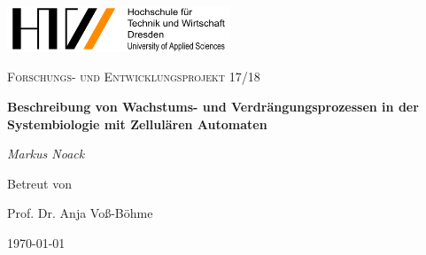 \documentclass[11pt,a4paper,pointlessnumbers]{scrreprt}  %
\begin{document}
	\begin{titlepage}
		\centering
		\includegraphics[width=0.5\textwidth]{Htw-dresden-logo}\par\vspace{1cm}
		{\scshape\Large Forschungs- und Entwicklungsprojekt 17/18\par}
		\vspace{1.5cm}
		{\huge\bfseries Beschreibung von Wachstums- und
			Verdrängungsprozessen in der Systembiologie mit
			Zellulären Automaten\par}
		\vspace{2cm}
		{\Large\itshape Markus Noack\par}
		\vfill
		Betreut von\par
		Prof. Dr. Anja Voß-Böhme
		
		\vfill
		
		{\large \today\par}
	\end{titlepage}

\tableofcontents 
\end{document}
